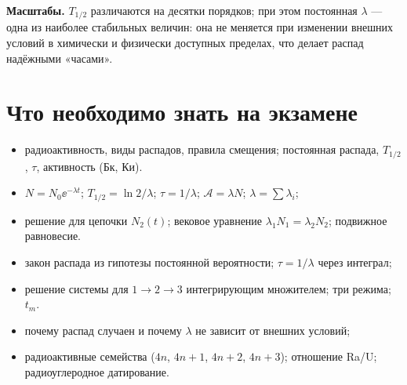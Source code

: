 \textbf{Масштабы.} $T_{1/2}$ различаются на десятки порядков; при этом постоянная $\lambda$ — одна из наиболее стабильных величин:
она не меняется при изменении внешних условий в химически и физически доступных пределах, что делает распад
надёжными «часами».

\section{Что необходимо знать на экзамене}

\begin{examcheck}
\begin{itemize}
 \item радиоактивность, виды распадов, правила смещения; постоянная распада, $T_{1/2}$, $\tau$, активность (Бк, Ки).
\end{itemize}
\begin{itemize}
 \item $N=N_0\ee^{-\lambda t}$; $T_{1/2}=\ln2/\lambda$; $\tau=1/\lambda$; $\mathcal A=\lambda N$; $\lambda=\sum\lambda_i$;
 \item решение для цепочки $N_2(t)$; вековое уравнение $\lambda_1N_1=\lambda_2N_2$; подвижное равновесие.
\end{itemize}
\begin{itemize}
 \item закон распада из гипотезы постоянной вероятности; $\tau=1/\lambda$ через интеграл;
 \item решение системы для $1\to2\to3$ интегрирующим множителем; три режима; $t_m$.
\end{itemize}
\begin{itemize}
 \item почему распад случаен и почему $\lambda$ не зависит от внешних условий;
 \item радиоактивные семейства ($4n$, $4n+1$, $4n+2$, $4n+3$); отношение Ra/U; радиоуглеродное датирование.
\end{itemize}
\end{examcheck}
